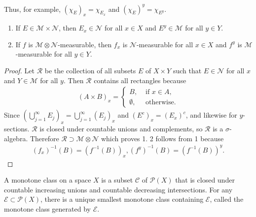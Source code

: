Thus, for example, $(\chi_{E})_{x} = \chi_{E_{x}}$ and $(\chi_{E})^{y} = \chi_{E^{y}}$.

\begin{proposition}

    \begin{enumerate}
        \item If $E \in \mathcal{M} \times \mathcal{N}$, then $E_x \in \mathcal{N}$ for all $x \in X$ and $E^y \in \mathcal{M}$ for all $y \in Y$.
        \item If $f$ is $\mathcal{M} \otimes \mathcal{N}$-measurable, then $f_x$ is $\mathcal{N}$-measurable for all $x \in X$ and $f^y$ is $\mathcal{M}$-measurable for all $y \in Y$. 
    \end{enumerate}
\end{proposition}

\begin{proof}
    Let $\mathcal{R}$ be the collection of all subsets $E$ of $X \times Y$ such that $E \in \mathcal{N}$ for all $x$ and $Y \in \mathcal{M}$ for all $y$. 
    Then $\mathcal{R}$ contains all rectangles because
    \begin{align}
        (A \times B)_x = \begin{cases}
            B, & \text{ if } x \in A, \\
            \emptyset, & \text{ otherwise}.
        \end{cases}
    \end{align}
    Since $(\bigcup_{j=1}^{\infty} E_j)_x = \bigcup_{j=1}^{\infty} (E_j)_x$ and $(E^c)_x = (E_x)^c$, and likewise for $y$-sections.
    $\mathcal{R}$ is closed under countable unions and complements, so $\mathcal{R}$ is a $\sigma$-algebra.
    Therefore $\mathcal{R} \supset \mathcal{M} \otimes \mathcal{N}$ which proves 1.
    2 follows from 1 because
    \begin{align}
        (f_x)^{-1}(B) = (f^{-1}(B))_x,
        (f^y)^{-1}(B) = (f^{-1}(B))^y.
    \end{align}
\end{proof}

\begin{definition}
    A monotone class on a space $X$ is a subset $\mathcal{C}$ of $\mathcal{P}(X)$ that is closed under countable increasing unions and countable decreasing intersections.
    For any $\mathcal{E} \subset \mathcal{P}(X)$, there is a unique smallest monotone class containing $\mathcal{E}$, called the monotone class generated by $\mathcal{E}$.
\end{definition}

